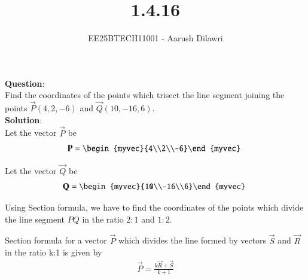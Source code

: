 \documentclass[journal]{IEEEtran}
\begin{document}

\vspace{3cm}

\title{1.4.16}
\author{EE25BTECH11001 - Aarush Dilawri}
{\let\newpage\relax\maketitle}

\renewcommand{\thefigure}{\theenumi}
\renewcommand{\thetable}{\theenumi}
\setlength{\intextsep}{10pt} %
\textbf{Question}:\\
Find the coordinates of the points which trisect the line segment joining the points $\vec{P}(4,2,-6)$ and $\vec{Q}(10,-16,6)$.\\


\textbf{Solution}:\\
Let the vector $\vec{P}$ be 
\begin{align*}
    \vec{P}=\begin{myvec}{4\\2\\-6}\end{myvec} \;
\end{align*}

Let the vector $\vec{Q}$ be 
\begin{align*}
    \vec{Q}=\begin{myvec}{10\\-16\\6}\end{myvec} \;
\end{align*}

Using Section formula, we have to find the coordinates of the points which divide the line segment $PQ$ in the ratio $2:1$ and $1:2$.

Section formula for a vector $\vec{P}$ which divides the line formed by vectors $\vec{S}$ and $\vec{R}$ in the ratio k:1 is given by
\begin{align*}
    \vec{P}=\frac{k\vec{R}+\vec{S}}{k+1}
\end{align*}
\end{document}
